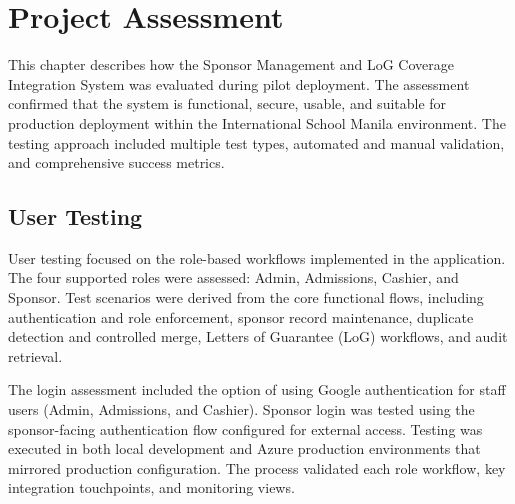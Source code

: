 
%

\section{Project Assessment}

This chapter describes how the Sponsor Management and LoG Coverage Integration System was evaluated during pilot deployment. The assessment confirmed that the system is functional, secure, usable, and suitable for production deployment within the International School Manila environment. The testing approach included multiple test types, automated and manual validation, and comprehensive success metrics.

\subsection{User Testing}

User testing focused on the role-based workflows implemented in the application. The four supported roles were assessed: Admin, Admissions, Cashier, and Sponsor. Test scenarios were derived from the core functional flows, including authentication and role enforcement, sponsor record maintenance, duplicate detection and controlled merge, Letters of Guarantee (LoG) workflows, and audit retrieval.

The login assessment included the option of using Google authentication for staff users (Admin, Admissions, and Cashier). Sponsor login was tested using the sponsor-facing authentication flow configured for external access. Testing was executed in both local development and Azure production environments that mirrored production configuration. The process validated each role workflow, key integration touchpoints, and monitoring views.

